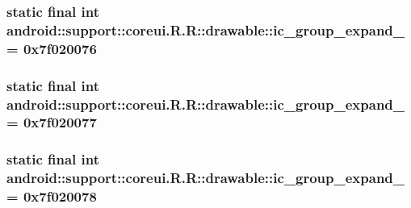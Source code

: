 \hypertarget{classandroid_1_1support_1_1coreui_1_1_r_1_1drawable_51096db9967c5e6300b28a93aedbeb84}{
\subsubsection[{ic\_\-group\_\-expand\_\-07}]{\setlength{\rightskip}{0pt plus 5cm}static final int android::support::coreui.R.R::drawable::ic\_\-group\_\-expand\_ = 0x7f020076}}
\label{classandroid_1_1support_1_1coreui_1_1_r_1_1drawable_51096db9967c5e6300b28a93aedbeb84}


\hypertarget{classandroid_1_1support_1_1coreui_1_1_r_1_1drawable_98e98e04ff9a4e3f43cc376554d4935e}{
\subsubsection[{ic\_\-group\_\-expand\_\-08}]{\setlength{\rightskip}{0pt plus 5cm}static final int android::support::coreui.R.R::drawable::ic\_\-group\_\-expand\_ = 0x7f020077}}
\label{classandroid_1_1support_1_1coreui_1_1_r_1_1drawable_98e98e04ff9a4e3f43cc376554d4935e}


\hypertarget{classandroid_1_1support_1_1coreui_1_1_r_1_1drawable_940b2a2c1ceb4423f01a8019f5ba2179}{
\subsubsection[{ic\_\-group\_\-expand\_\-09}]{\setlength{\rightskip}{0pt plus 5cm}static final int android::support::coreui.R.R::drawable::ic\_\-group\_\-expand\_ = 0x7f020078}}
\label{classandroid_1_1support_1_1coreui_1_1_r_1_1drawable_940b2a2c1ceb4423f01a8019f5ba2179}


